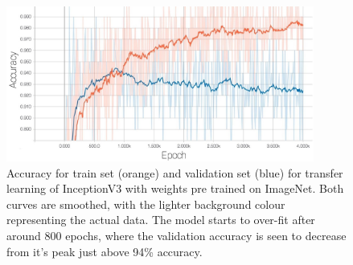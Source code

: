\documentclass[11pt]{article}
\begin{document}
\begin{figure}[H]
  \begin{center}
    \includegraphics[width=0.9\textwidth]{images/inception_SUNRGBD.jpg}
  \end{center}
  \caption{Accuracy for train set (orange) and validation set (blue) for transfer learning of InceptionV3 with weights pre trained on ImageNet. Both curves are smoothed, with the lighter background colour representing the actual data. The model starts to over-fit after around 800 epochs, where the validation accuracy is seen to decrease from it's peak just above 94\% accuracy.}
  \label{fig:incept_trans}
\end{figure}




\end{document}
